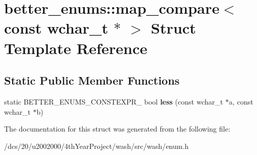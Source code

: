 \hypertarget{structbetter__enums_1_1map__compare_3_01const_01wchar__t_01_5_01_4}{}\section{better\+\_\+enums\+:\+:map\+\_\+compare$<$ const wchar\+\_\+t $\ast$ $>$ Struct Template Reference}
\label{structbetter__enums_1_1map__compare_3_01const_01wchar__t_01_5_01_4}
\subsection*{Static Public Member Functions}
\begin{DoxyCompactItemize}
\item 
\mbox{\label{structbetter__enums_1_1map__compare_3_01const_01wchar__t_01_5_01_4_a3d92f104915178f31373c48579a2a9d8}} 
static B\+E\+T\+T\+E\+R\+\_\+\+E\+N\+U\+M\+S\+\_\+\+C\+O\+N\+S\+T\+E\+X\+P\+R\+\_\+ bool {\bfseries less} (const wchar\+\_\+t $\ast$a, const wchar\+\_\+t $\ast$b)
\end{DoxyCompactItemize}


The documentation for this struct was generated from the following file\+:\begin{DoxyCompactItemize}
\item 
/dcs/20/u2002000/4th\+Year\+Project/wash/src/wash/enum.\+h\end{DoxyCompactItemize}

